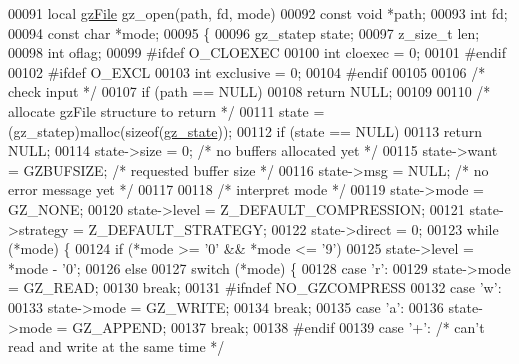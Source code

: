 \begin{DoxyCode}
{00091 local \hyperlink{structgz_file__s}{gzFile} gz\_open(path, fd, mode)
00092     \textcolor{keyword}{const} \textcolor{keywordtype}{void} *path;
00093     \textcolor{keywordtype}{int} fd;
00094     \textcolor{keyword}{const} \textcolor{keywordtype}{char} *mode;
00095 \{
00096     gz\_statep state;
00097     z\_size\_t len;
00098     \textcolor{keywordtype}{int} oflag;
00099 \textcolor{preprocessor}{#ifdef O\_CLOEXEC}
00100     \textcolor{keywordtype}{int} cloexec = 0;
00101 \textcolor{preprocessor}{#endif}
00102 \textcolor{preprocessor}{#ifdef O\_EXCL}
00103     \textcolor{keywordtype}{int} exclusive = 0;
00104 \textcolor{preprocessor}{#endif}
00105 
00106     \textcolor{comment}{/* check input */}
00107     \textcolor{keywordflow}{if} (path == NULL)
00108         \textcolor{keywordflow}{return} NULL;
00109 
00110     \textcolor{comment}{/* allocate gzFile structure to return */}
00111     state = (gz\_statep)malloc(\textcolor{keyword}{sizeof}(\hyperlink{structgz__state}{gz\_state}));
00112     \textcolor{keywordflow}{if} (state == NULL)
00113         \textcolor{keywordflow}{return} NULL;
00114     state->size = 0;            \textcolor{comment}{/* no buffers allocated yet */}
00115     state->want = GZBUFSIZE;    \textcolor{comment}{/* requested buffer size */}
00116     state->msg = NULL;          \textcolor{comment}{/* no error message yet */}
00117 
00118     \textcolor{comment}{/* interpret mode */}
00119     state->mode = GZ\_NONE;
00120     state->level = Z\_DEFAULT\_COMPRESSION;
00121     state->strategy = Z\_DEFAULT\_STRATEGY;
00122     state->direct = 0;
00123     \textcolor{keywordflow}{while} (*mode) \{
00124         \textcolor{keywordflow}{if} (*mode >= \textcolor{charliteral}{'0'} && *mode <= \textcolor{charliteral}{'9'})
00125             state->level = *mode - \textcolor{charliteral}{'0'};
00126         \textcolor{keywordflow}{else}
00127             \textcolor{keywordflow}{switch} (*mode) \{
00128             \textcolor{keywordflow}{case} \textcolor{charliteral}{'r'}:
00129                 state->mode = GZ\_READ;
00130                 \textcolor{keywordflow}{break};
00131 \textcolor{preprocessor}{#ifndef NO\_GZCOMPRESS}
00132             \textcolor{keywordflow}{case} \textcolor{charliteral}{'w'}:
00133                 state->mode = GZ\_WRITE;
00134                 \textcolor{keywordflow}{break};
00135             \textcolor{keywordflow}{case} \textcolor{charliteral}{'a'}:
00136                 state->mode = GZ\_APPEND;
00137                 \textcolor{keywordflow}{break};
00138 \textcolor{preprocessor}{#endif}
00139             \textcolor{keywordflow}{case} \textcolor{charliteral}{'+'}:       \textcolor{comment}{/* can't read and write at the same time */}
}
\end{DoxyCode}
